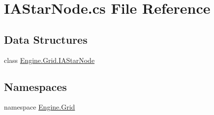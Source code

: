 \hypertarget{a00089}{}\section{I\+A\+Star\+Node.\+cs File Reference}
\label{a00089}
\subsection*{Data Structures}
\begin{DoxyCompactItemize}
\item 
class \hyperlink{a00410}{Engine.\+Grid.\+I\+A\+Star\+Node}
\end{DoxyCompactItemize}
\subsection*{Namespaces}
\begin{DoxyCompactItemize}
\item 
namespace \hyperlink{a00251}{Engine.\+Grid}
\end{DoxyCompactItemize}
